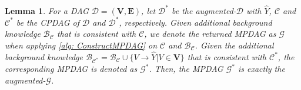 \documentclass{article} %
\newtheorem{lemma}{Lemma}[section]
\begin{document}
\begin{lemma} \label{lem: mpdag2mpdag}
    For a DAG $\mathcal{D}=(\mathbf{V}, \mathbf{E})$, let $\mathcal{D^{*}}$ be the augmented-$\mathcal{D}$ with $\hat{Y}$, $\mathcal{C}$ and $\mathcal{C^{*}}$ be the CPDAG of $\mathcal{D}$ and $\mathcal{D^{*}}$, respectively. Given additional background knowledge $\mathcal{B_C}$ that is consistent with $\mathcal{C}$, we denote the returned MPDAG as $\mathcal{G}$ when applying \cref{alg: ConstructMPDAG} on $\mathcal{C}$ and $\mathcal{B_C}$. Given the additional background knowledge $\mathcal{B_{C^{*}}} = \mathcal{B_C} \cup \{V \rightarrow \hat{Y}|V \in \mathbf{V}\}$ that is consistent with $\mathcal{C^{*}}$, the corresponding MPDAG is denoted as $\mathcal{G^{*}}$. Then, the MPDAG $\mathcal{G^{*}}$ is exactly the augmented-$\mathcal{G}$.
\end{lemma}
\end{document}
